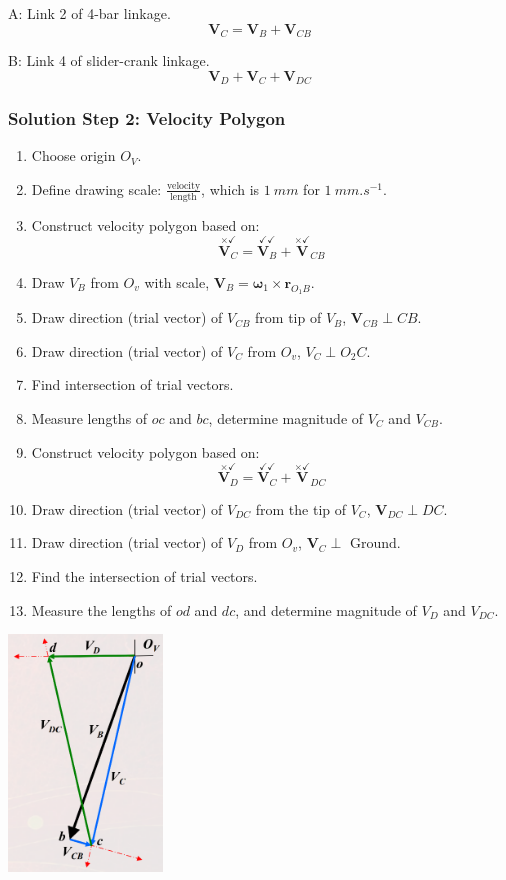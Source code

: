 \documentclass[11pt]{article}
\begin{document}
A: Link 2 of 4-bar linkage.
\[\boldsymbol{V}_C = \boldsymbol{V}_B + \boldsymbol{V}_{CB}\]

B: Link 4 of slider-crank linkage.
\[\boldsymbol{V}_D + \boldsymbol{V}_C + \boldsymbol{V}_{DC}\]

 \newpage
\subsubsection{Solution Step 2: Velocity Polygon}
\label{sec:orgf5ef4cc}
\begin{enumerate}
\item Choose origin \(O_V\).
\item Define drawing scale: \(\frac{\text{velocity}}{\text{length}}\), which is \(\qty{1}{mm}\) for \(\qty{1}{mm.s^{-1}}\).
\item Construct velocity polygon based on:
\[\overset{\times \checkmark}{\boldsymbol{V}_C} = \overset{\checkmark \checkmark}{\boldsymbol{V}_B} + \overset{\times \checkmark}{\boldsymbol{V}}_{CB}\]
\item Draw \(V_B\) from \(O_v\) with scale, \(\boldsymbol{V}_B = \boldsymbol{\omega}_1 \times \boldsymbol{r}_{O_1 B}\).
\item Draw direction (trial vector) of \(V_{CB}\) from tip of \(V_B\), \(\boldsymbol{V}_{CB} \perp CB\).
\item Draw direction (trial vector) of \(V_C\) from \(O_v\), \(V_C \perp O_2 C\).
\item Find intersection of trial vectors.
\item Measure lengths of \(oc\) and \(bc\), determine magnitude of \(V_C\) and \(V_{CB}\).
\item Construct velocity polygon based on:
\[\overset{\times \checkmark}{\boldsymbol{V}_D} = \overset{\checkmark \checkmark}{\boldsymbol{V}_C} + \overset{\times \checkmark}{\boldsymbol{V}}_{DC}\]
\item Draw direction (trial vector) of \(V_{DC}\) from the tip of \(V_C\), \(\boldsymbol{V}_{DC} \perp DC\).
\item Draw direction (trial vector) of \(V_{D}\) from \(O_v\), \(\boldsymbol{V}_C \perp \text{ Ground}\).
\item Find the intersection of trial vectors.
\item Measure the lengths of \(od\) and \(dc\), and determine magnitude of \(V_D\) and \(V_{DC}\).
\end{enumerate}

\begin{center}
\includegraphics[height=17em]{./images/combination-of-basic-linkages-graphical-analysis-velocity-polygon.png}
\end{center}
\end{document}
